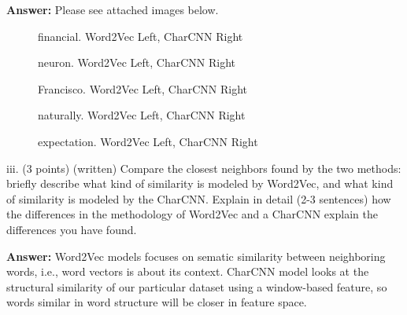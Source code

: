 \documentclass{article}
\begin{document}
\bigbreak
\noindent
\textbf{Answer:} Please see attached images below.
\begin{figure}
    \centering
    \qquad
    \caption{financial. Word2Vec Left, CharCNN Right}
    \label{fig:example}
\end{figure}
\begin{figure}
    \centering
    \qquad
    \caption{neuron. Word2Vec Left, CharCNN Right}
    \label{fig:example}
\end{figure}
\begin{figure}
    \centering
    \qquad
    \caption{Francisco. Word2Vec Left, CharCNN Right}
    \label{fig:example}
\end{figure}
\begin{figure}
    \centering
    \qquad
    \caption{naturally. Word2Vec Left, CharCNN Right}
    \label{fig:example}
\end{figure}
\begin{figure}
    \centering
    \qquad
    \caption{expectation. Word2Vec Left, CharCNN Right}
    \label{fig:example}
\end{figure}

\clearpage
\bigbreak
\noindent
iii. (3 points)  (written) Compare the closest neighbors found by the two methods:  briefly describe what kind of similarity is modeled by Word2Vec,  and what kind of similarity is modeled by the CharCNN. Explain in detail (2-3 sentences) how the differences in the methodology of Word2Vec and a CharCNN explain the differences you have found.
   
\bigbreak
\noindent
\textbf{Answer:} Word2Vec models focuses on sematic similarity between neighboring words, i.e., word vectors is about its context. CharCNN model looks at the structural similarity of our particular dataset using a window-based feature, so words similar in word structure will be closer in feature space.
\end{document}
